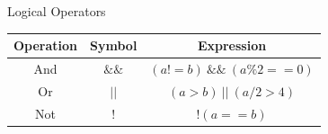 \begin{frame}[fragile]{Logical Operators}{}
    \Large
    \begin{table}[]
    \centering
    \begin{tabular}{ccc}
    \hline
    \textbf{Operation} & \textbf{Symbol} & \textbf{Expression}        \\ \hline
    And                & $\&\&$          & $(a \mathrel!= b) \ \&\& \ (a \% 2 == 0)$ \\ \hline
    Or                 & $||$            & $(a > b) \ || \ (a / 2 > 4)$   \\ \hline
    Not                & $!$             & $!(a == b)$                \\ \hline
    \end{tabular}
    \end{table}
\end{frame}

